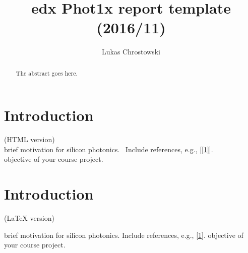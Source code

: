 \title{edx Phot1x report template (2016/11)
}



\author{Lukas Chrostowski}




\maketitle

\begin{abstract}
The abstract goes here.
%
\end{abstract}%




\section{Introduction}\label{auto-label-section-729047}

(HTML version)\\

brief motivation for silicon photonics. ~Include references, e.g.,
{[}\hyperref[csl:1]{[1]}{]}. ~\\
objective of your course project.\\

\section{Introduction}

(LaTeX version)

brief motivation for silicon photonics.  Include references, e.g., \hyperref[csl:1]{[1]}.  
objective of your course project.


